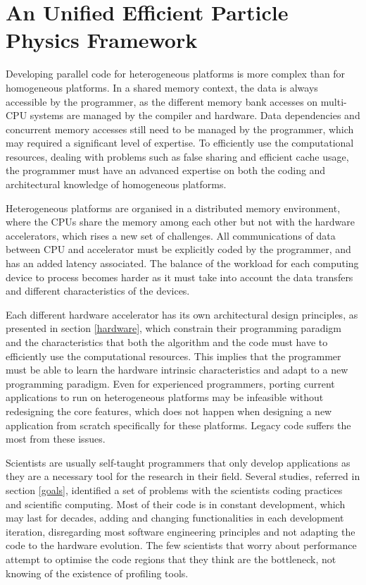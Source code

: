 \chapter{An Unified Efficient Particle Physics Framework}
\label{new_lipmini}

Developing parallel code for heterogeneous platforms is more complex than for homogeneous platforms. In a shared memory context, the data is always accessible by the programmer, as the different memory bank accesses on multi-CPU systems are managed by the compiler and hardware. Data dependencies and concurrent memory accesses still need to be managed by the programmer, which may required a significant level of expertise. To efficiently use the computational resources, dealing with problems such as false sharing and efficient cache usage, the programmer must have an advanced expertise on both the coding and architectural knowledge of homogeneous platforms.

Heterogeneous platforms are organised in a distributed memory environment, where the CPUs share the memory among each other but not with the hardware accelerators, which rises a new set of challenges. All communications of data between CPU and accelerator must be explicitly coded by the programmer, and has an added latency associated. The balance of the workload for each computing device to process becomes harder as it must take into account the data transfers and different characteristics of the devices.

Each different hardware accelerator has its own architectural design principles, as presented in section \ref{hardware}, which constrain their programming paradigm and the characteristics that both the algorithm and the code must have to efficiently use the computational resources. This implies that the programmer must be able to learn the hardware intrinsic characteristics and adapt to a new programming paradigm. Even for experienced programmers, porting current applications to run on heterogeneous platforms may be infeasible without redesigning the core features, which does not happen when designing a new application from scratch specifically for these platforms. Legacy code suffers the most from these issues.

Scientists are usually self-taught programmers that only develop applications as they are a necessary tool for the research in their field. Several studies, referred in section \ref{goals}, identified a set of problems with the scientists coding practices and scientific computing. Most of their code is in constant development, which may last for decades, adding and changing functionalities in each development iteration, disregarding most software engineering principles and not adapting the code to the hardware evolution. The few scientists that worry about performance attempt to optimise the code regions that they think are the bottleneck, not knowing of the existence of profiling tools.

